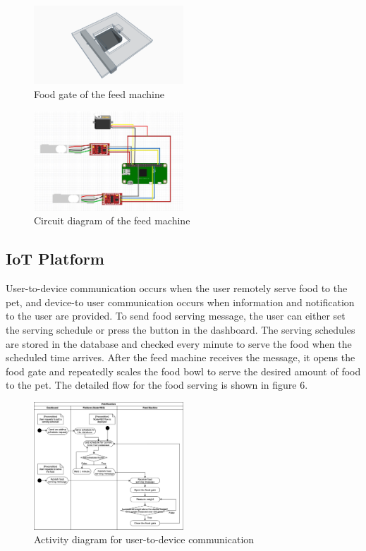 ﻿\documentclass[conference]{IEEEtran}
\begin{document}
\begin{figure}[htbp]
\centerline{\includegraphics[width=0.5\textwidth]{./images/servo_gate.png}}
\caption{Food gate of the feed machine}
\label{fig}
\end{figure}

\begin{figure}[htbp]
\centerline{\includegraphics[width=0.5\textwidth]{./images/feed machine circuit.jpg}}
\caption{Circuit diagram of the feed machine}
\label{fig}
\end{figure}

\subsection{IoT Platform}
User-to-device communication occurs when the user remotely serve food to the pet, and device-to user communication occurs when information and notification to the user are provided.
To send food serving message, the user can either set the serving schedule or press the button in the dashboard.
The serving schedules are stored in the database and checked every minute to serve the food when the scheduled time arrives.
After the feed machine receives the message, it opens the food gate and repeatedly scales the food bowl to serve the desired amount of food to the pet.
The detailed flow for the food serving is shown in figure 6.

\begin{figure}[htbp]
\centerline{\includegraphics[width=0.5\textwidth]{./images/user2device.png}}
\caption{Activity diagram for user-to-device communication}
\label{fig}
\end{figure}
\end{document}
